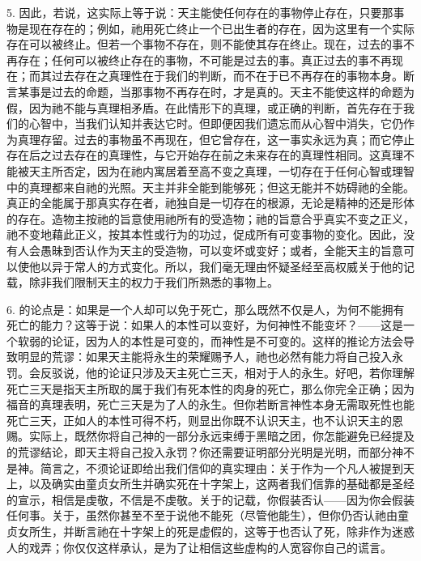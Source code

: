 5. 因此，若说，这实际上等于说：天主能使任何存在的事物停止存在，只要那事物是现在存在的；例如，祂用死亡终止一个已出生者的存在，因为这里有一个实际存在可以被终止。但若一个事物不存在，则不能使其存在终止。现在，过去的事不再存在；任何可以被终止存在的事物，不可能是过去的事。真正过去的事不再现在；而其过去存在之真理性在于我们的判断，而不在于已不再存在的事物本身。断言某事是过去的命题，当那事物不再存在时，才是真的。天主不能使这样的命题为假，因为祂不能与真理相矛盾。在此情形下的真理，或正确的判断，首先存在于我们的心智中，当我们认知并表达它时。但即便因我们遗忘而从心智中消失，它仍作为真理存留。过去的事物虽不再现在，但它曾存在，这一事实永远为真；而它停止存在后之过去存在的真理性，与它开始存在前之未来存在的真理性相同。这真理不能被天主所否定，因为在祂内寓居着至高不变之真理，一切存在于任何心智或理智中的真理都来自祂的光照。天主并非全能到能够死；但这无能并不妨碍祂的全能。真正的全能属于那真实存在者，祂独自是一切存在的根源，无论是精神的还是形体的存在。造物主按祂的旨意使用祂所有的受造物；祂的旨意合乎真实不变之正义，祂不变地藉此正义，按其本性或行为的功过，促成所有可变事物的变化。因此，没有人会愚昧到否认作为天主的受造物，可以变坏或变好；或者，全能天主的旨意可以使他以异于常人的方式变化。所以，我们毫无理由怀疑圣经至高权威关于他的记载，除非我们限制天主的权力于我们所熟悉的事物上。\par

6. 的论点是：如果是一个人却可以免于死亡，那么既然不仅是人，为何不能拥有死亡的能力？这等于说：如果人的本性可以变好，为何神性不能变坏？——这是一个软弱的论证，因为人的本性是可变的，而神性是不可变的。这样的推论方法会导致明显的荒谬：如果天主能将永生的荣耀赐予人，祂也必然有能力将自己投入永罚。会反驳说，他的论证只涉及天主死亡三天，相对于人的永生。好吧，若你理解死亡三天是指天主所取的属于我们有死本性的肉身的死亡，那么你完全正确；因为福音的真理表明，死亡三天是为了人的永生。但你若断言神性本身无需取死性也能死亡三天，正如人的本性可得不朽，则显出你既不认识天主，也不认识天主的恩赐。实际上，既然你将自己神的一部分永远束缚于黑暗之团，你怎能避免已经提及的荒谬结论，即天主将自己投入永罚？你还需要证明部分光明是光明，而部分神不是神。简言之，不须论证即给出我们信仰的真实理由：关于作为一个凡人被提到天上，以及确实由童贞女所生并确实死在十字架上，这两者我们信靠的基础都是圣经的宣示，相信是虔敬，不信是不虔敬。关于的记载，你假装否认——因为你会假装任何事。关于，虽然你甚至不至于说他不能死（尽管他能生），但你仍否认祂由童贞女所生，并断言祂在十字架上的死是虚假的，这等于也否认了死，除非作为迷惑人的戏弄；你仅仅这样承认，是为了让相信这些虚构的人宽容你自己的谎言。\par

